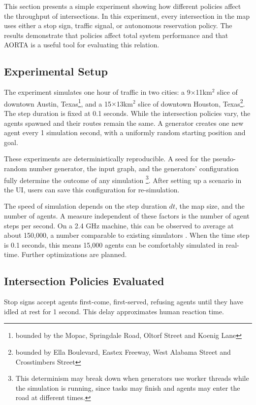 \documentclass[letterpaper, 10 pt, conference]{ieeeconf}  %
\begin{document}
This section presents a simple experiment showing how different policies affect
the throughput of intersections. In this experiment, every intersection in the
map uses either a stop sign, traffic signal, or autonomous reservation policy.
The results demonstrate that policies affect total system performance and that
AORTA is a useful tool for evaluating this relation.

\subsection{Experimental Setup}

The experiment simulates one hour of traffic in two cities: a
9$\times$11km$^{2}$ slice of downtown Austin, Texas\footnote{bounded by the
Mopac, Springdale Road, Oltorf Street and Koenig Lane}, and a
15$\times$13km$^{2}$ slice of downtown Houston, Texas\footnote{bounded by Ella
Boulevard, Eastex Freeway, West Alabama Street and Crosstimbers Street}.  The
step duration is fixed at 0.1 seconds. While the intersection policies vary,
the agents spawned and their routes remain the same.  A generator creates one
new agent every 1 simulation second, with a uniformly random starting position
and goal.

These experiments are deterministically reproducible. A seed for the
pseudo-random number generator, the input graph, and the generators'
configuration fully determine the outcome of any simulation \footnote{This
determinism may break down when generators use worker threads while the
simulation is running, since tasks may finish and agents may enter the road at
different times.}. After setting up a scenario in the UI, users can save this
configuration for re-simulation.

The speed of simulation depends on the step duration $dt$, the map size, and the
number of agents. A measure independent of these factors is the number of agent
steps per second. On a 2.4 GHz machine, this can be observed to average at
about 150,000, a number comparable to existing simulators \cite{SUMOthesis}.
When the time step is 0.1 seconds, this means 15,000 agents can be comfortably
simulated in real-time. Further optimizations are planned.

\subsection{Intersection Policies Evaluated}

Stop signs accept agents first-come, first-served, refusing agents until they
have idled at rest for 1 second. This delay approximates human reaction time.
\end{document}
